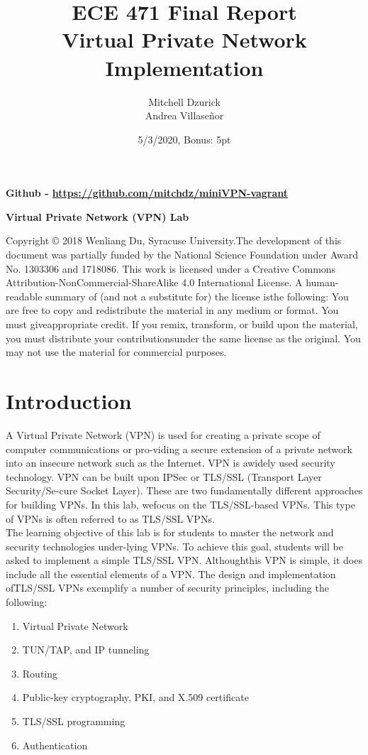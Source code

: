 \documentclass[12pt]{article}
\title {{\bf ECE 471 Final Report} \\
\large{Virtual Private Network Implementation}}
\author{Mitchell Dzurick\\Andrea Villaseñor}
\date{5/3/2020, Bonus: 5pt}
\newcommand\tab[1][0.5cm]{\hspace*{#1}}
\begin{document}
\maketitle
\textbf{Github - \url{https://github.com/mitchdz/miniVPN-vagrant}}
\\
\tableofcontents 




\begin{center}
    \textbf{Virtual Private Network (VPN) Lab}
\end{center}

Copyright © 2018  Wenliang Du, Syracuse University.The development of this document was partially funded by the National Science Foundation under Award No. 1303306 and 1718086.  This work is licensed under a Creative Commons Attribution-NonCommercial-ShareAlike 4.0 International License. A human-readable summary of (and not a substitute for) the license isthe following:  You are free to copy and redistribute the material in any medium or format.  You must giveappropriate credit. If you remix, transform, or build upon the material, you must distribute your contributionsunder the same license as the original. You may not use the material for commercial purposes.

\section{Introduction}
A Virtual Private Network (VPN) is used for creating a private scope of computer communications or pro-viding a secure extension of a private network into an insecure network such as the Internet.   VPN is awidely used security technology.  VPN can be built upon IPSec or TLS/SSL (Transport Layer Security/Se-cure Socket Layer).  These are two fundamentally different approaches for building VPNs.  In this lab, wefocus on the TLS/SSL-based VPNs. This type of VPNs is often referred to as TLS/SSL VPNs. \\
\tab The learning objective of this lab is for students to master the network and security technologies under-lying VPNs.  To achieve this goal, students will be asked to implement a simple TLS/SSL VPN. Althoughthis VPN is simple, it does include all the essential elements of a VPN. The design and implementation ofTLS/SSL VPNs exemplify a number of security principles, including the following:

\begin{enumerate}
    \item Virtual Private Network
    \item TUN/TAP, and IP tunneling
    \item Routing
    \item Public-key cryptography, PKI, and X.509 certificate
    \item TLS/SSL programming
    \item Authentication
\end{enumerate}
\end{document}
